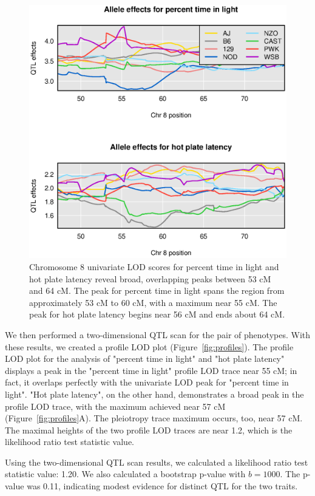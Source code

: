 \documentclass[12pt,twoside, lineno]{gsajnl}
\begin{document}
\begin{figure}
\includegraphics[width = \textwidth]{../Rmd/coefs.eps}
\caption{Chromosome 8 univariate LOD scores for percent time in light
  and hot plate latency reveal broad, overlapping peaks between 53 cM
  and 64 cM. The peak for percent time in light spans the region from
  approximately 53 cM to 60 cM, with a maximum near 55 cM. The peak
  for hot plate latency begins near 56 cM and ends about 64 cM.}
\label{fig:chr8-effects}
\end{figure}




We then performed a two-dimensional QTL scan for the pair of
phenotypes. With these results, we created a profile LOD plot
(Figure~\ref{fig:profiles}). The profile LOD plot for the analysis of "percent
time in light" and "hot plate latency" displays a peak in the "percent
time in light" profile LOD trace near 55 cM; in fact, it overlaps
perfectly with the univariate LOD peak for "percent time in light".
"Hot plate latency", on the other hand, demonstrates a broad peak in
the profile LOD trace, with the maximum achieved near 57 cM (Figure~\ref{fig:profiles}A).
The pleiotropy trace maximum occurs, too, near
57 cM. The maximal heights of the two profile LOD traces are near 1.2,
which is the likelihood ratio test statistic value.

Using the two-dimensional QTL scan results, we calculated a likelihood
ratio test statistic value: 1.20. We also calculated a bootstrap
p-value with $b = 1000$. The p-value was 0.11, indicating modest
evidence for distinct QTL for the two traits.
\end{document}
